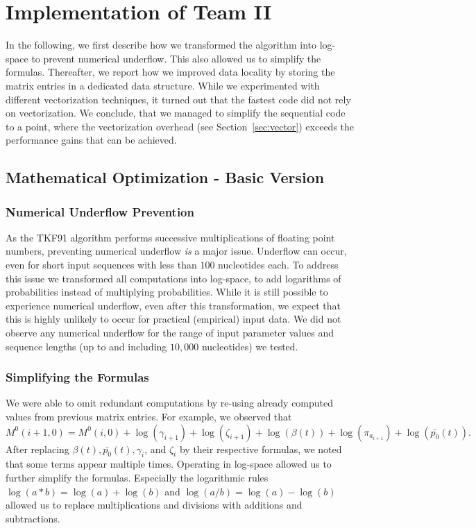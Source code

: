 \documentclass[runningheads,a4paper]{llncs}
\begin{document}
\section{Implementation of Team II}
\label{sec:implementation-2}

In the following, we first describe how we transformed the algorithm into log-space to prevent numerical underflow.
This also allowed us to simplify the formulas.
Thereafter, we report how we improved data locality by storing the matrix entries in a dedicated data structure.
While we experimented with different vectorization techniques, it turned out that the fastest code did not rely on vectorization.
We conclude, that we managed to simplify the sequential code to a point, where the vectorization overhead (see Section~\ref{sec:vector}) 
exceeds the performance gains that can be achieved.

\subsection{Mathematical Optimization - Basic Version}

\subsubsection{Numerical Underflow Prevention}
\label{sec:log}

As the TKF91 algorithm performs successive multiplications of floating point numbers, preventing numerical underflow
{\em is} a major issue. Underflow can occur, even for short input sequences with less than $100$ nucleotides each.
To address this issue we transformed all computations into log-space, to add logarithms of probabilities instead of multiplying probabilities.
While it is still possible to experience numerical underflow, even after this transformation,
we expect that this is highly unlikely to occur for practical (empirical) input data.
We did not observe any numerical underflow for the range of input parameter values and sequence lengths (up to and including $10,000$ nucleotides)
we tested. 

\subsubsection{Simplifying the Formulas}
We were able to omit redundant computations by re-using already computed values from previous matrix entries.
For example, we observed that $$M^0(i+1,0) = M^0(i,0) + \log(\gamma_{i+1}) + \log(\zeta_{i+1}) + \log(\beta(t)) + \log(\pi_{a_{i+1}}) + \log(\bar{p_0}(t)).$$
After replacing $\beta(t), \bar{p_0}(t), \gamma_i$, and $\zeta_i$ by their respective formulas, we noted that some terms appear multiple times.
Operating in log-space allowed us to further simplify the formulas. Especially the logarithmic rules $\log(a*b) = \log(a) + \log(b)$ and $\log(a/b) = \log(a) - \log(b)$
allowed us to replace multiplications and divisions with additions and subtractions.
\end{document}
